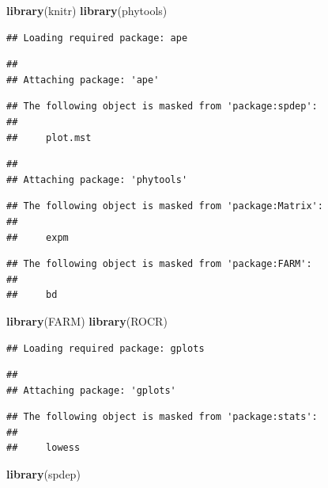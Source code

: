 \documentclass[]{book}
\newenvironment{Shaded}{\begin{snugshade}}{\end{snugshade}}
\newcommand{\KeywordTok}[1]{\textcolor[rgb]{0.13,0.29,0.53}{\textbf{{#1}}}}
\newcommand{\NormalTok}[1]{{#1}}
\theoremstyle{definition}
\theoremstyle{definition}
\theoremstyle{remark}
\begin{document}
\begin{Shaded}
\begin{Highlighting}[]
\KeywordTok{library}\NormalTok{(knitr)}
\KeywordTok{library}\NormalTok{(phytools)}
\end{Highlighting}
\end{Shaded}

\begin{verbatim}
## Loading required package: ape
\end{verbatim}

\begin{verbatim}
## 
## Attaching package: 'ape'
\end{verbatim}

\begin{verbatim}
## The following object is masked from 'package:spdep':
## 
##     plot.mst
\end{verbatim}

\begin{verbatim}
## 
## Attaching package: 'phytools'
\end{verbatim}

\begin{verbatim}
## The following object is masked from 'package:Matrix':
## 
##     expm
\end{verbatim}

\begin{verbatim}
## The following object is masked from 'package:FARM':
## 
##     bd
\end{verbatim}

\begin{Shaded}
\begin{Highlighting}[]
\KeywordTok{library}\NormalTok{(FARM)}
\KeywordTok{library}\NormalTok{(ROCR)}
\end{Highlighting}
\end{Shaded}

\begin{verbatim}
## Loading required package: gplots
\end{verbatim}

\begin{verbatim}
## 
## Attaching package: 'gplots'
\end{verbatim}

\begin{verbatim}
## The following object is masked from 'package:stats':
## 
##     lowess
\end{verbatim}

\begin{Shaded}
\begin{Highlighting}[]
\KeywordTok{library}\NormalTok{(spdep)}
\end{Highlighting}
\end{Shaded}
\end{document}
